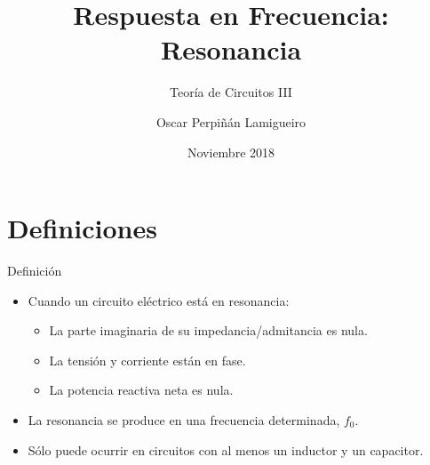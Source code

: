 \documentclass[xcolor={usenames,svgnames,dvipsnames}]{beamer}
\author{Oscar Perpiñán Lamigueiro}
\date{Noviembre 2018}
\title{Respuesta en Frecuencia: Resonancia}
\subtitle{Teoría de Circuitos III}
\begin{document}
\maketitle

\section{Definiciones}
\label{sec:org644ffc4}
\begin{frame}[label={sec:org0ec125e}]{Definición}
\begin{itemize}
\item Cuando un circuito eléctrico está en resonancia:
\begin{itemize}
\item La \alert{parte imaginaria} de su impedancia/admitancia es \alert{nula}.
\item La \alert{tensión y corriente} están en \alert{fase}.
\item La \alert{potencia reactiva} neta es \alert{nula}.
\end{itemize}
\item La resonancia se produce en una \alert{frecuencia determinada}, \(f_0\).
\item Sólo puede ocurrir en circuitos con \alert{al menos un inductor y un capacitor}.
\end{itemize}
\end{frame}
\end{document}

